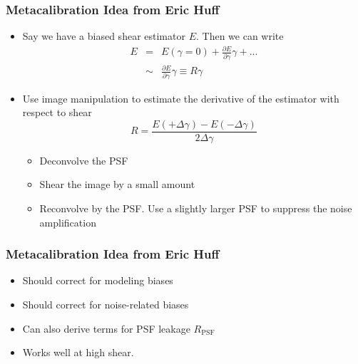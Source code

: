 \documentclass{beamer}
\begin{document}
\frame
{
    \frametitle{Metacalibration Idea from Eric Huff}

 
    \begin{itemize}

        \item Say we have a biased shear estimator {\color{gold} $E$}.  Then we can write
            {\color{gold}
                \begin{eqnarray}
                    E & = & E(\gamma=0) + \frac{\partial E}{\partial \gamma} \gamma + ... \nonumber \\
                      & \sim &  \frac{\partial E}{\partial \gamma} \gamma \equiv R \gamma \nonumber 
                \end{eqnarray}
            } 
        \item Use image manipulation to estimate the derivative of the
            estimator with respect to shear
            {\color{gold}
                \begin{equation}
                    R = \frac{E(+\Delta\gamma) - E(-\Delta\gamma)}{2 \Delta \gamma} \nonumber 
                \end{equation}
            }
            \begin{itemize}
                \item Deconvolve the PSF
                \item Shear the image by a small amount
                \item Reconvolve by the PSF.  Use a slightly larger PSF to suppress
                    the noise amplification
            \end{itemize}


    \end{itemize}

}

\frame
{
    \frametitle{Metacalibration Idea from Eric Huff}

 
    \begin{itemize}
        
        \item Should correct for modeling biases

        \item Should correct for noise-related biases

        \item Can also derive terms for PSF leakage {\color{gold} $R_{\mathrm{PSF}}$ }

        \item Works well at high shear.

    \end{itemize}

}
\end{document}
